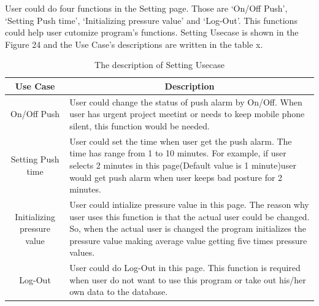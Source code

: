 \documentclass[conference]{IEEEtran}
\begin{document}
 User could do four functions in the Setting page. Those are ‘On/Off Push’, ‘Setting Push time’, ‘Initializing pressure value’ and ‘Log-Out’. This functions could help user cutomize program’s functions. Setting Usecase is shown in the Figure 24 and the Use Case’s descriptions are written in the table x.

\begin{table}[h]
{\renewcommand\arraystretch{1.25}
\caption{The description of Setting Usecase}
\begin{tabular}{|c|l|l|} \hline
Use Case & \multicolumn{2}{c|}{Description} \\ \hline\hline
On/Off Push & \multicolumn{2}{p{5cm}|}{\raggedright User could change the status of push alarm by On/Off. When user has urgent project meetint or needs to keep mobile phone silent, this function would be needed.} \\ \hline
Setting Push time & \multicolumn{2}{p{5cm}|}{\raggedright User could set the time when user get the push alarm. The time has range from 1 to 10 minutes. For example, if user selects 2 minutes in this page(Default value is 1 minute)user would get push alarm when user keeps bad posture for 2 minutes.  } \\ \hline
Initializing pressure value & \multicolumn{2}{p{5cm}|}{\raggedright User could intialize pressure value in this page. The reason why user uses this function is that the actual user could be changed. So, when the actual user is changed the program initializes the pressure value making average value getting five times pressure values. } \\ \hline
Log-Out & \multicolumn{2}{p{5cm}|}{\raggedright User could do Log-Out in this page. This function is required when user do not want to use this program or take out his/her own data to the database. } \\ \hline
\end{tabular}}
\end{table}
\end{document}
